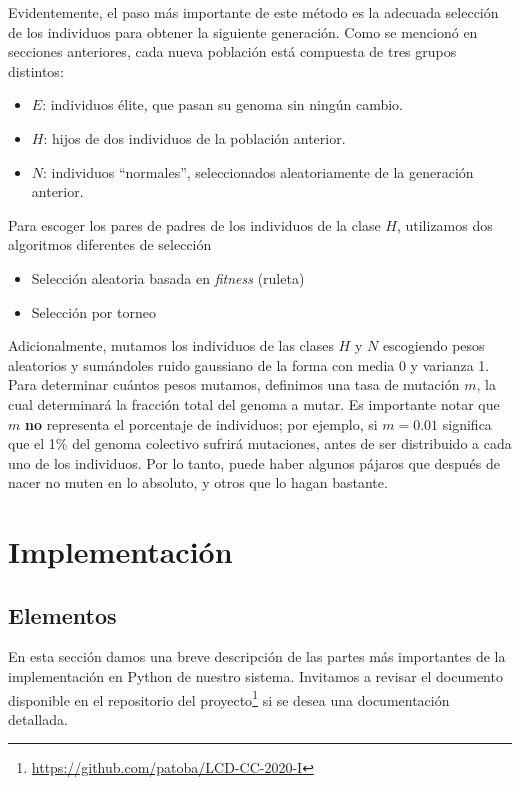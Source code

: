 \documentclass[twocolumn,spanish]{revtex4-1}
\begin{document}
Evidentemente, el paso más importante de este método es la adecuada selección de los individuos para obtener la siguiente generación. Como se mencionó en secciones anteriores, cada nueva población está compuesta de tres grupos distintos: 
\begin{itemize}
    \item $E$: individuos élite, que pasan su genoma sin ningún cambio.
    \item $H$: hijos de dos individuos de la población anterior.
    \item $N$: individuos ``normales'', seleccionados aleatoriamente de la generación anterior.
\end{itemize}
Para escoger los pares de padres de los individuos de la clase $H$, utilizamos dos algoritmos diferentes de selección
\begin{itemize}
    \item Selección aleatoria basada en \textit{fitness} (ruleta)
    \item Selección por torneo
\end{itemize}
Adicionalmente, mutamos los individuos de las clases $H$ y $N$ escogiendo pesos aleatorios y sumándoles ruido gaussiano de la forma con media 0 y varianza 1. Para determinar cuántos pesos mutamos, definimos una tasa de mutación $m$, la cual determinará la fracción total del genoma a mutar. Es importante notar que $m$ \textbf{no} representa el porcentaje de individuos; por ejemplo, si $m=0.01$ significa que el 1\% del genoma colectivo sufrirá mutaciones, antes de ser distribuido a cada uno de los individuos. Por lo tanto, puede haber algunos pájaros que después de nacer no muten en lo absoluto, y otros que lo hagan bastante.

\section{Implementación}
\subsection{Elementos}
En esta sección damos una breve descripción de las partes más importantes de la implementación en Python de nuestro sistema. Invitamos a revisar el documento disponible en el repositorio del proyecto\footnote{\url{https://github.com/patoba/LCD-CC-2020-I}} si se desea una documentación detallada.
\end{document}
